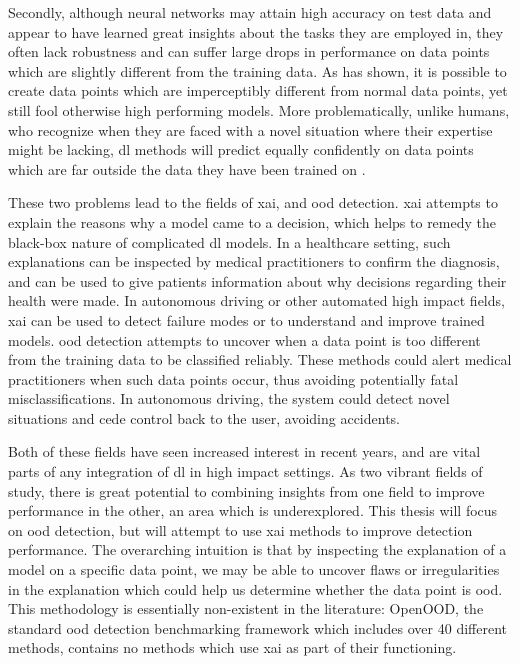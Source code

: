 \documentclass[UKenglish]{uiomasterthesis} %
\theoremstyle{definition}
\begin{document}
Secondly, although neural networks may attain high accuracy on test data and appear to have learned great insights about the tasks they are employed in, they often lack robustness and can suffer large drops in performance on data points which are slightly different from the training data. As \cite{intriguing} has shown, it is possible to create data points which are imperceptibly different from normal data points, yet still fool otherwise high performing models. More problematically, unlike humans, who recognize when they are faced with a novel situation where their expertise might be lacking, \ac{dl} methods will predict equally confidently on data points which are far outside the data they have been trained on \cite{tingsim}.

These two problems lead to the fields of \ac{xai}, and \ac{ood} detection. \ac{xai} attempts to explain the reasons why a model came to a decision, which helps to remedy the black-box nature of complicated \ac{dl} models. In a healthcare setting, such explanations can be inspected by medical practitioners to confirm the diagnosis, and can be used to give patients information about why decisions regarding their health were made. In autonomous driving or other automated high impact fields, \ac{xai} can be used to detect failure modes or to understand and improve trained models. \ac{ood} detection attempts to uncover when a data point is too different from the training data to be classified reliably. These methods could alert medical practitioners when such data points occur, thus avoiding potentially fatal misclassifications. In autonomous driving, the system could detect novel situations and cede control back to the user, avoiding accidents.

Both of these fields have seen increased interest in recent years, and are vital parts of any integration of \ac{dl} in high impact settings. As two vibrant fields of study, there is great potential to combining insights from one field to improve performance in the other, an area which is underexplored. This thesis will focus on \ac{ood} detection, but will attempt to use \ac{xai} methods to improve detection performance. The overarching intuition is that by inspecting the explanation of a model on a specific data point, we may be able to uncover flaws or irregularities in the explanation which could help us determine whether the data point is \ac{ood}. This methodology is essentially non-existent in the literature: OpenOOD, the standard \ac{ood} detection benchmarking framework which includes over 40 different methods, contains no methods which use \ac{xai} as part of their functioning.
\end{document}
